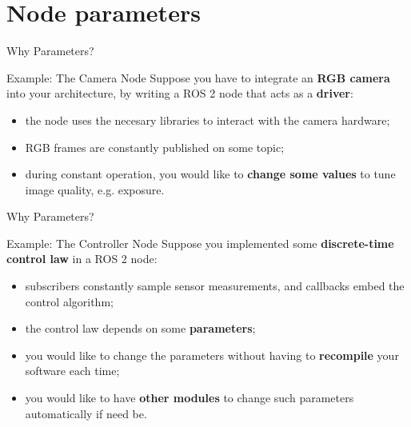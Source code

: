 
\section{Node parameters}

\begin{frame}{Why Parameters?}
\begin{exampleblock}{Example: The Camera Node}
  Suppose you have to integrate an \textbf{RGB camera} into your architecture, by writing a ROS 2 node that acts as a \textbf{driver}:
  \begin{itemize}
    \item the node uses the necesary libraries to interact with the camera hardware;
    \item RGB frames are constantly published on some topic;
    \item during constant operation, you would like to \textbf{change some values} to tune image quality, e.g. exposure.
  \end{itemize}
\end{exampleblock}
\end{frame}
\begin{frame}{Why Parameters?}
\begin{exampleblock}{Example: The Controller Node}
  Suppose you implemented some \textbf{discrete-time control law} in a ROS 2 node:
  \begin{itemize}
    \item subscribers constantly sample sensor measurements, and callbacks embed the control algorithm;
    \item the control law depends on some \textbf{parameters};
    \item you would like to change the parameters without having to \textbf{recompile} your software each time;
    \item you would like to have \textbf{other modules} to change such parameters automatically if need be.
  \end{itemize}
\end{exampleblock}
\end{frame}

